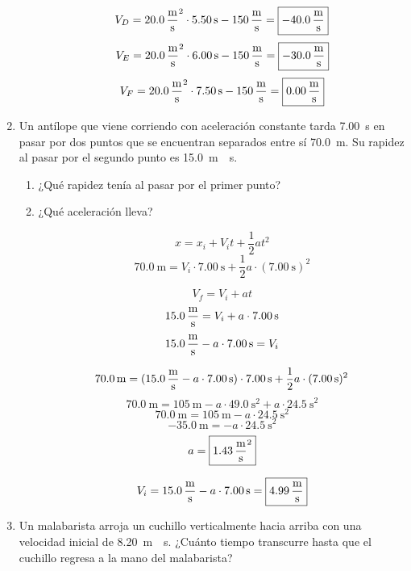 \documentclass[Análisis.root.tex]{subfiles}
\begin{document}
\begin{enumerate}
\begin{itemize}
\begin{multicols}{2}
                  \[V_D=\SI{20,0}{\meter\over\second\squared}\cdot\SI{5,50}{\second}-\SI{150}{\meter\over\second}=\boxed{\SI{-40,0}{\meter\over\second}}\]
                  \[V_E=\SI{20,0}{\meter\over\second\squared}\cdot\SI{6,00}{\second}-\SI{150}{\meter\over\second}=\boxed{\SI{-30,0}{\meter\over\second}}\]
                  \[V_F=\SI{20,0}{\meter\over\second\squared}\cdot\SI{7,50}{\second}-\SI{150}{\meter\over\second}=\boxed{\SI{0,00}{\meter\over\second}}\]
                \end{multicols}
        \end{itemize}

  \item Un antílope que viene corriendo con aceleración constante tarda \SI{7,00}{\second} en pasar por dos puntos que se encuentran separados entre sí \SI{70,0}{\meter}. Su rapidez al pasar por el segundo punto es \SI{15,0}{\meter\over\second}.

        \begin{enumerate}
          \item ¿Qué rapidez tenía al pasar por el primer punto?
          \item ¿Qué aceleración lleva?

                \[x=x_i+V_it+\frac{1}{2}at^2\]
                \[\SI{70,0}{\meter}=V_i\cdot\SI{7,00}{\second}+\frac{1}{2}a\cdot(\SI{7,00}{\second})^2\]

                \[V_f=V_i+at\]
                \[\SI{15,0}{\meter\over\second}=V_i+a\cdot\SI{7,00}{\second}\]
                \[\SI{15,0}{\meter\over\second}-a\cdot\SI{7,00}{\second}=V_i\]

                \[\SI{70,0}{\meter}=(\SI{15,0}{\meter\over\second}-a\cdot\SI{7,00}{\second})\cdot\SI{7,00}{\second}+\frac{1}{2}a\cdot(\SI{7,00}{\second})^2\]
                \[\SI{70,0}{\meter}=\SI{105}{\meter}-a\cdot\SI{49,0}{\second\squared}+a\cdot\SI{24,5}{\second}^2\]
                \[\SI{70,0}{\meter}=\SI{105}{\meter}-a\cdot\SI{24,5}{\second\squared}\]
                \[\SI{-35,0}{\meter}=-a\cdot\SI{24,5}{\second\squared}\]
                \[a=\boxed{\SI{1,43}{\meter\over\second\squared}}\]

                \[V_i=\SI{15,0}{\meter\over\second}-a\cdot\SI{7,00}{\second}=\boxed{\SI{4,99}{\meter\over\second}}\]
        \end{enumerate}

  \item Un malabarista arroja un cuchillo verticalmente hacia arriba con una velocidad inicial de \SI{8,20}{\meter\over\second}. ¿Cuánto tiempo transcurre hasta que el cuchillo regresa a la mano del malabarista?


\end{enumerate}
\end{document}

